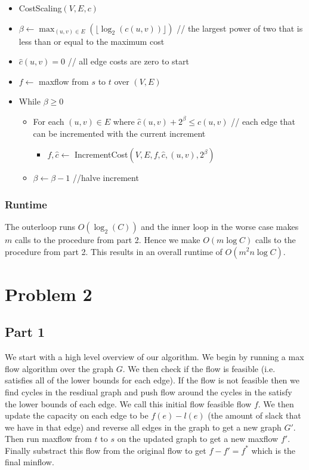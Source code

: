 \documentclass[a4paper]{article}
\begin{document}
\begin{itemize}
	\item CostScaling$(V, E, c)$
	\item $\beta \gets \max_{(u,v) \in E}(\lfloor\log_2(c(u,v))\rfloor)$ // the largest power of two that is less than or equal to the maximum cost
	\item $\hat{c}(u,v) = 0$ // all edge costs are zero to start
	\item $f \gets $ maxflow from $s$ to $t$ over $(V, E)$
	\item While $\beta \geq 0$
	\begin{itemize}
		\item For each $(u,v) \in E$ where $\hat{c}(u,v) + 2^\beta \leq c(u,v)$ // each edge that can be incremented with the current increment
		\begin{itemize}
			\item $f, \hat{c} \gets $ IncrementCost$(V, E, f, \hat{c}, (u,v), 2^\beta)$
		\end{itemize}
		\item $\beta \gets \beta - 1$ //halve increment
	\end{itemize}
\end{itemize}


\subsubsection*{Runtime}

The outerloop runs $O(\log_2(C))$ and the inner loop in the worse case 
makes $m$ calls to the procedure from part 2. Hence we make $O(m\log C)$ calls
to the procedure from part 2. This results in an overall runtime of $O(m^2n\log C)$.


\section{Problem 2}

\subsection{Part 1}
We start with a high level overview of our algorithm.
We begin by running a max flow algorithm over the graph $G$. We then 
check if the flow is feasible (i.e. satisfies all of the lower bounds for each 
edge). If the flow is not feasible then we find cycles in the resdiual graph 
and push flow around the cycles in the satisfy the lower bounds of each edge. We call 
this initial flow feasible flow $f$.
We then update the capacity on each edge to be $f(e) - l(e)$ (the amount of slack that we 
have in that edge) and reverse all edges in the graph to get a new graph $G'$.
Then run maxflow from $t$ to $s$ on the updated graph to get a new maxflow $f'$. Finally substract this 
flow from the original flow to get $f - f' = f^*$ which is the final minflow.
\end{document}
